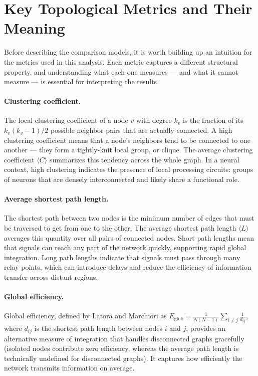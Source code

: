 \documentclass[12pt,a4paper]{report}
\begin{document}
\section{Key Topological Metrics and Their Meaning}

Before describing the comparison models, it is worth building up an intuition for the metrics used in this analysis. Each metric captures a different structural property, and understanding what each one measures — and what it cannot measure — is essential for interpreting the results.

\paragraph{Clustering coefficient.} The local clustering coefficient of a node $v$ with degree $k_v$ is the fraction of its $k_v(k_v-1)/2$ possible neighbor pairs that are actually connected. A high clustering coefficient means that a node's neighbors tend to be connected to one another — they form a tightly-knit local group, or clique. The average clustering coefficient $\langle C \rangle$ summarizes this tendency across the whole graph. In a neural context, high clustering indicates the presence of local processing circuits: groups of neurons that are densely interconnected and likely share a functional role.

\paragraph{Average shortest path length.} The shortest path between two nodes is the minimum number of edges that must be traversed to get from one to the other. The average shortest path length $\langle L \rangle$ averages this quantity over all pairs of connected nodes. Short path lengths mean that signals can reach any part of the network quickly, supporting rapid global integration. Long path lengths indicate that signals must pass through many relay points, which can introduce delays and reduce the efficiency of information transfer across distant regions.

\paragraph{Global efficiency.} Global efficiency, defined by Latora and Marchiori \cite{latora2001efficient} as $E_{\text{glob}} = \frac{1}{N(N-1)} \sum_{i \neq j} \frac{1}{d_{ij}}$, where $d_{ij}$ is the shortest path length between nodes $i$ and $j$, provides an alternative measure of integration that handles disconnected graphs gracefully (isolated nodes contribute zero efficiency, whereas the average path length is technically undefined for disconnected graphs). It captures how efficiently the network transmits information on average.
\end{document}

